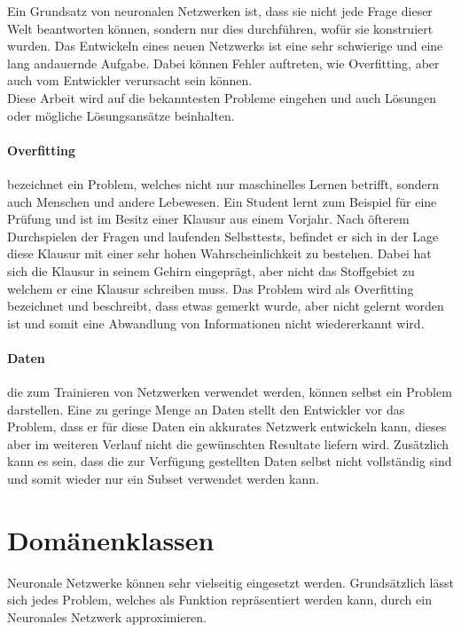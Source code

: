 Ein Grundsatz von neuronalen Netzwerken ist, dass sie nicht jede Frage dieser Welt beantworten können, sondern nur dies durchführen, wofür sie konstruiert wurden. 
Das Entwickeln eines neuen Netzwerks ist eine sehr schwierige und eine lang andauernde Aufgabe. 
Dabei können Fehler auftreten, wie Overfitting, aber auch vom Entwickler verursacht sein können. \\

\noindent
Diese Arbeit wird auf die bekanntesten Probleme eingehen und auch Lösungen oder mögliche Lösungsansätze beinhalten. 

\paragraph{Overfitting} bezeichnet ein Problem, welches nicht nur maschinelles Lernen betrifft, sondern auch Menschen und andere Lebewesen. 
Ein Student lernt zum Beispiel für eine Prüfung und ist im Besitz einer Klausur aus einem Vorjahr. 
Nach öfterem Durchspielen der Fragen und laufenden Selbsttests, befindet er sich in der Lage diese Klausur mit einer sehr hohen Wahrscheinlichkeit zu bestehen. 
Dabei hat sich die Klausur in seinem Gehirn eingeprägt, aber nicht das Stoffgebiet zu welchem er eine Klausur schreiben muss. 
Das Problem wird als Overfitting bezeichnet und beschreibt, dass etwas gemerkt wurde, aber nicht gelernt worden ist und somit eine Abwandlung von Informationen nicht wiedererkannt wird.

\paragraph{Daten} die zum Trainieren von Netzwerken verwendet werden, können selbst ein Problem darstellen.
Eine zu geringe Menge an Daten stellt den Entwickler vor das Problem, dass er für diese Daten ein akkurates Netzwerk entwickeln kann, dieses aber im weiteren Verlauf nicht die gewünschten Resultate liefern wird.
Zusätzlich kann es sein, dass die zur Verfügung gestellten Daten selbst nicht vollständig sind und somit wieder nur ein Subset verwendet werden kann. \\

\section{Domänenklassen}
\label{sec:Domänenklassen}

Neuronale Netzwerke können sehr vielseitig eingesetzt werden. 
Grundsätzlich lässt sich jedes Problem, welches als Funktion repräsentiert werden kann, durch ein Neuronales Netzwerk approximieren. \\

